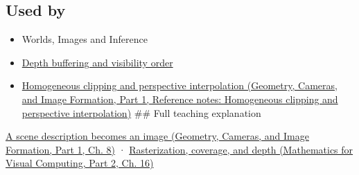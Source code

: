 \subsection{Used by}\label{appendix-ed3f9bc298fe-used-by}

\hypertarget{appendix-ed3f9bc298fe-used-by}{}

\begin{itemize}
\item
  {Worlds, Images and Inference}
\item
  \hyperref[appendix-97578ed97952]{Depth buffering and visibility order}
\item
  \href{../03-Geometry-Cameras-and-Image-Formation-P01/main.pdf\#nameddest=appendix-40426e4b2103}{Homogeneous clipping and perspective interpolation (Geometry, Cameras, and Image Formation, Part 1, Reference notes: Homogeneous clipping and perspective interpolation)} \#\# Full teaching explanation
\end{itemize}

\href{../03-Geometry-Cameras-and-Image-Formation-P01/main.pdf\#nameddest=03-visual-computing-i-ch001-a-scene-description-becomes-an-image}{A scene description becomes an image (Geometry, Cameras, and Image Formation, Part 1, Ch. 8)} · \href{../02-Mathematics-for-Visual-Computing-P02/main.pdf\#nameddest=03-visual-computing-i-ch012-rasterization-coverage-and-depth}{Rasterization, coverage, and depth (Mathematics for Visual Computing, Part 2, Ch. 16)}
